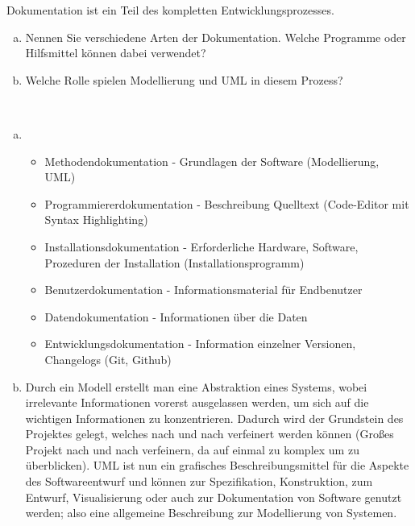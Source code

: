     
    
        \begin{aufgabe}
            Dokumentation ist ein Teil des kompletten Entwicklungsprozesses.
            \\[-.7cm]\begin{enumerate}[(a)]
                \setlength\itemsep{0.1px}
                \item Nennen Sie verschiedene Arten der Dokumentation. Welche Programme oder Hilfsmittel können dabei verwendet?
                \item Welche Rolle spielen Modellierung und UML in diesem Prozess?
            \end{enumerate}
        \end{aufgabe}
    
        \begin{loesung}\:
            \\[-.7cm]\begin{enumerate}[(a)]
                \setlength\itemsep{0.1px}
                \item 
                \begin{itemize}
                    \setlength\itemsep{0.1px}
                    \item Methodendokumentation - Grundlagen der Software (Modellierung, UML)
                    \item Programmiererdokumentation - Beschreibung Quelltext (Code-Editor mit Syntax Highlighting)
                    \item Installationsdokumentation - Erforderliche Hardware, Software, Prozeduren der Installation (Installationsprogramm)
                    \item Benutzerdokumentation - Informationsmaterial für Endbenutzer
                    \item Datendokumentation - Informationen über die Daten
                    \item Entwicklungsdokumentation - Information einzelner Versionen, Changelogs (Git, Github)
                \end{itemize}
                \item Durch ein Modell erstellt man eine Abstraktion eines Systems, wobei irrelevante Informationen vorerst ausgelassen werden, um sich auf die wichtigen Informationen zu konzentrieren. Dadurch wird der Grundstein des Projektes gelegt, welches nach und nach verfeinert werden können (Großes Projekt nach und nach verfeinern, da auf einmal zu komplex um zu überblicken). UML ist nun ein grafisches Beschreibungsmittel für die Aspekte des Softwareentwurf und können zur Spezifikation, Konstruktion, zum Entwurf, Visualisierung oder auch zur Dokumentation von Software genutzt werden; also eine allgemeine Beschreibung zur Modellierung von Systemen.
            \end{enumerate}
        \end{loesung}
	
